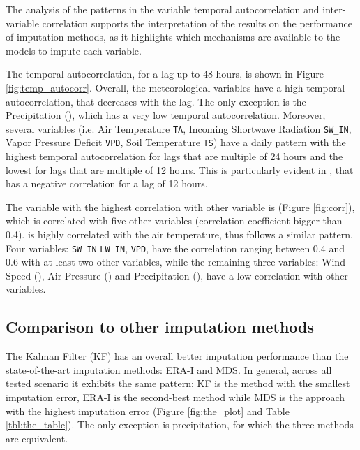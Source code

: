 \documentclass{article}
\let\Oldsubsection\subsection
\renewcommand{\subsection}{\FloatBarrier\Oldsubsection}
\begin{document}
The analysis of the patterns in the variable temporal autocorrelation and inter-variable correlation supports the interpretation of the results on the performance of imputation methods, as it highlights which mechanisms are available to the models to impute each variable.

The temporal autocorrelation, for a lag up to 48 hours, is shown in Figure \ref{fig:temp_autocorr}. Overall, the meteorological variables have a high temporal autocorrelation, that decreases with the lag. The only exception is the Precipitation (), which has a very low temporal autocorrelation. Moreover, several variables (i.e. Air Temperature \texttt{TA}, Incoming Shortwave Radiation \texttt{SW\_IN},  Vapor Pressure Deficit \texttt{VPD}, Soil Temperature \texttt{TS}) have a daily pattern with the highest temporal autocorrelation for lags that are multiple of 24 hours and the lowest for lags that are multiple of 12 hours. This is particularly evident in , that has a negative correlation for a lag of 12 hours.

The variable with the highest correlation with other variable is  (Figure \ref{fig:corr}), which is correlated with five other variables (correlation coefficient bigger than 0.4).
 is highly correlated with the air temperature, thus follows a similar pattern.
Four variables: \texttt{SW\_IN} \texttt{LW\_IN}, \texttt{VPD},  have the correlation ranging between 0.4 and 0.6 with at least two other variables,
while the remaining three variables: Wind Speed (), Air Pressure () and Precipitation (), have a low correlation with other variables.


\subsection{Comparison to other imputation methods}

The Kalman Filter (KF) has an overall better imputation performance than the state-of-the-art imputation methods: ERA-I and MDS.
In general, across all tested scenario it exhibits the same pattern: KF is the method with the smallest imputation error,
ERA-I is the second-best method while MDS is the approach with the highest imputation error (Figure \ref{fig:the_plot} and Table \ref{tbl:the_table}). The only exception is precipitation, for which the three methods are equivalent.
\end{document}
